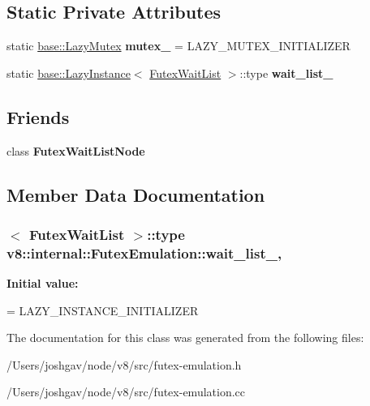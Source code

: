 \subsection*{Static Private Attributes}
\begin{DoxyCompactItemize}
\item 
static \hyperlink{structv8_1_1base_1_1_lazy_instance_impl}{base\+::\+Lazy\+Mutex} {\bfseries mutex\+\_\+} = L\+A\+Z\+Y\+\_\+\+M\+U\+T\+E\+X\+\_\+\+I\+N\+I\+T\+I\+A\+L\+I\+Z\+ER\hypertarget{classv8_1_1internal_1_1_futex_emulation_ae403c300f1599ce881f4654fe1a0f407}{}\label{classv8_1_1internal_1_1_futex_emulation_ae403c300f1599ce881f4654fe1a0f407}

\item 
static \hyperlink{structv8_1_1base_1_1_lazy_instance}{base\+::\+Lazy\+Instance}$<$ \hyperlink{classv8_1_1internal_1_1_futex_wait_list}{Futex\+Wait\+List} $>$\+::type {\bfseries wait\+\_\+list\+\_\+}
\end{DoxyCompactItemize}
\subsection*{Friends}
\begin{DoxyCompactItemize}
\item 
class {\bfseries Futex\+Wait\+List\+Node}\hypertarget{classv8_1_1internal_1_1_futex_emulation_a468b1954483b12644e4ac971b41740f2}{}\label{classv8_1_1internal_1_1_futex_emulation_a468b1954483b12644e4ac971b41740f2}

\end{DoxyCompactItemize}


\subsection{Member Data Documentation}
\subsubsection[{\texorpdfstring{wait\+\_\+list\+\_\+}{wait_list_}}]{$<$ {\bf Futex\+Wait\+List} $>$\+::type v8\+::internal\+::\+Futex\+Emulation\+::wait\+\_\+list\+\_\+\hspace{0.3cm}{\ttfamily [static]}, {\ttfamily [private]}}\hypertarget{classv8_1_1internal_1_1_futex_emulation_a2e356aea06eb16ef06d25306f735c0bd}{}\label{classv8_1_1internal_1_1_futex_emulation_a2e356aea06eb16ef06d25306f735c0bd}
{\bfseries Initial value\+:}
\begin{DoxyCode}
=
    LAZY\_INSTANCE\_INITIALIZER
\end{DoxyCode}


The documentation for this class was generated from the following files\+:\begin{DoxyCompactItemize}
\item 
/\+Users/joshgav/node/v8/src/futex-\/emulation.\+h\item 
/\+Users/joshgav/node/v8/src/futex-\/emulation.\+cc\end{DoxyCompactItemize}
